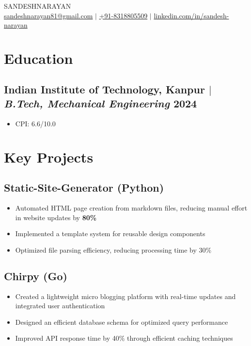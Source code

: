\documentclass[9pt]{article}
\begin{document}
\begin{center}
    {\fontsize{36}{36}\selectfont\interthin SANDESH\interheavy NARAYAN} \\ \bigskip
    {\color{icnclr}\faEnvelope[regular]} \href{mailto:sandeshnarayan81@gmail.com}{sandeshnarayan81@gmail.com} $|$ 
    {\color{icnclr}} \href{tel:+918318805509}{+91-8318805509} $|$
    {\color{icnclr}\faLinkedinIn} \href{https://linkedin.com/in/sandesh-narayan}{linkedin.com/in/sandesh-narayan}
\end{center}

\section{Education}
\subsection{Indian Institute of Technology, Kanpur $|$ \normalfont\textit{B.Tech, Mechanical Engineering} \hfill 2024}
\begin{itemize}
    \item CPI: 6.6/10.0
\end{itemize}

\section{Key Projects}
\subsection{Static-Site-Generator (Python)}
\begin{itemize}
    \item Automated HTML page creation from markdown files, reducing manual effort in website updates by \textbf{80\%}
    \item Implemented a template system for reusable design components
    \item Optimized file parsing efficiency, reducing processing time by 30\%
\end{itemize}

\subsection{Chirpy (Go)}
\begin{itemize}
    \item Created a lightweight micro blogging platform with real-time updates and integrated user authentication
    \item Designed an efficient database schema for optimized query performance
    \item Improved API response time by 40\% through efficient caching techniques
\end{itemize}
\end{document}
